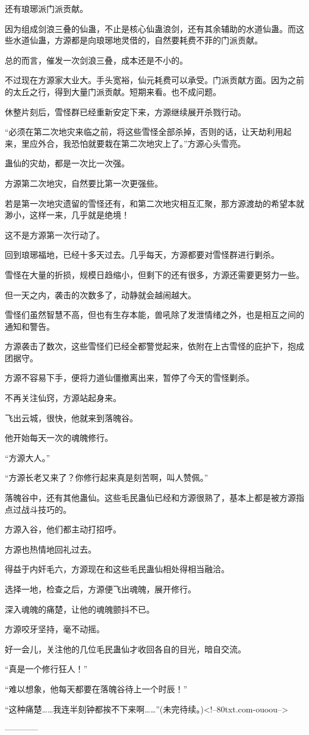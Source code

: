 \begin{this_body}
还有琅琊派门派贡献。

因为组成剑浪三叠的仙蛊，不止是核心仙蛊浪剑，还有其余辅助的水道仙蛊。而这些水道仙蛊，方源都是向琅琊地灵借的，自然要耗费不菲的门派贡献。

总的而言，催发一次剑浪三叠，成本还是不小的。

不过现在方源家大业大。手头宽裕，仙元耗费可以承受。门派贡献方面。因为之前的太丘之行，得到大量门派贡献。短期来看。也不成问题。

休整片刻后，雪怪群已经重新安定下来，方源继续展开杀戮行动。

“必须在第二次地灾来临之前，将这些雪怪全部杀掉，否则的话，让天劫利用起来，里应外合，我恐怕就要栽在第二次地灾上了。”方源心头雪亮。

蛊仙的灾劫，都是一次比一次强。

方源第二次地灾，自然要比第一次更强些。

若是第一次地灾遗留的雪怪还有，和第二次地灾相互汇聚，那方源渡劫的希望本就渺小，这样一来，几乎就是绝境！

这不是方源第一次行动了。

回到琅琊福地，已经十多天过去。几乎每天，方源都要对雪怪群进行剿杀。

雪怪在大量的折损，规模日趋缩小，但剩下的还有很多，方源还需要更努力一些。

但一天之内，袭击的次数多了，动静就会越闹越大。

雪怪们虽然智慧不高，但也有生存本能，兽吼除了发泄情绪之外，也是相互之间的通知和警告。

方源袭击了数次，这些雪怪们已经全都警觉起来，依附在上古雪怪的庇护下，抱成团据守。

方源不容易下手，便将力道仙僵撤离出来，暂停了今天的雪怪剿杀。

不再关注仙窍，方源站起身来。

飞出云城，很快，他就来到落魄谷。

他开始每天一次的魂魄修行。

“方源大人。”

“方源长老又来了？你修行起来真是刻苦啊，叫人赞佩。”

落魄谷中，还有其他蛊仙。这些毛民蛊仙已经和方源很熟了，基本上都是被方源指点过战斗技巧的。

方源入谷，他们都主动打招呼。

方源也热情地回礼过去。

得益于内奸毛六，方源现在和这些毛民蛊仙相处得相当融洽。

选择一地，检查之后，方源便飞出魂魄，展开修行。

深入魂魄的痛楚，让他的魂魄颤抖不已。

方源咬牙坚持，毫不动摇。

好一会儿，关注他的几位毛民蛊仙才收回各自的目光，暗自交流。

“真是一个修行狂人！”

“难以想象，他每天都要在落魄谷待上一个时辰！”

“这种痛楚……我连半刻钟都挨不下来啊……”(未完待续。)<!--80txt.com-ouoou-->

------------

\end{this_body}

